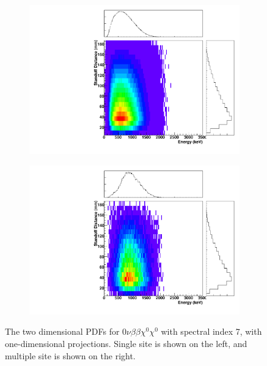 \documentclass[herrin-thesis.tex]{subfiles}
\begin{document}
\begin{figure}[hp]
\centering
	\begin{subfigure}[b]{0.35\textwidth}
	\centering
	\includegraphics[width=\textwidth]{./plots/PDFs/analysis_pdf_bb0nX7_ss.pdf}
\end{subfigure}\hspace{0.1\textwidth}%
\begin{subfigure}[b]{0.35\textwidth}
	\centering
	\includegraphics[width=1\textwidth]{./plots/PDFs/analysis_pdf_bb0nX7_ms.pdf}
	\end{subfigure}
\caption[PDF for \(0\nu\beta\beta\chi^{0}\chi^{0}\)]{The two dimensional PDFs for \(0\nu\beta\beta\chi^{0}\chi^{0}\) with spectral index 7, with one-dimensional projections. Single site is shown on the left, and multiple site is shown on the right.}
\label{fig:analysis_pdf_bb0nX7}
\end{figure}
\end{document}
